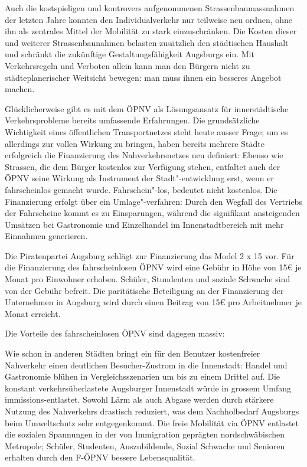   Auch die kostspieligen und kontrovers aufgenommenen Strassenbaumassnahmen 
  der letzten Jahre konnten den Individualverkehr nur teilweise neu ordnen, 
  ohne ihn als zentrales Mittel der Mobilität zu stark einzuschränken. Die 
  Kosten dieser und weiterer Strassenbaunahmen belasten zusätzlich den 
  städtischen Haushalt und schränkt die zukünftige Gestaltungsfähigkeit 
  Augsburgs ein. Mit Verkehrsregeln und Verboten allein kann man den Bürgern 
  nicht zu städteplanerischer Weitsicht bewegen: man muss ihnen ein besseres 
  Angebot machen.
  
  Glücklicherweise gibt es mit dem ÖPNV als Lösungsansatz für innerstädtische 
  Verkehrsprobleme bereits umfassende Erfahrungen. Die grundsätzliche 
  Wichtigkeit eines öffentlichen Transportnetzes steht heute ausser Frage; um 
  es allerdings zur vollen Wirkung zu bringen, haben bereits mehrere Städte 
  erfolgreich die Finanzierung des Nahverkehrsnetzes neu definiert: Ebenso wie 
  Strassen, die dem Bürger kostenlos zur Verfügung stehen, entfaltet auch der 
  ÖPNV seine Wirkung als Instrument der Stadt"-entwicklung erst, wenn er 
  fahrscheinlos gemacht wurde. Fahrschein"-los, bedeutet nicht kostenlos. Die 
  Finanzierung erfolgt über ein Umlage"-verfahren: Durch den Wegfall des 
  Vertriebs der Fahrscheine kommt es zu Einsparungen, während die signifikant 
  ansteigenden Umsätzen bei Gastronomie und Einzelhandel im Innenstadtbereich 
  mit mehr Einnahmen generieren.
  
  Die Piratenpartei Augsburg schlägt zur Finanzierung das Model 2 x 15 vor. 
  Für die Finanzierung des fahrscheinlosen ÖPNV wird eine Gebühr in Höhe von 
  15€ je Monat pro Einwohner erhoben. Schüler, Stundenten und soziale Schwache 
  sind von der Gebühr befreit. Die paritätische Beteiligung an der 
  Finanzierung der Unternehmen in Augsburg wird durch einen Beitrag von 15€ 
  pro Arbeitnehmer je Monat erreicht.
  
  Die Vorteile des fahrscheinlosen ÖPNV sind dagegen massiv:
  
  Wie schon in anderen Städten bringt ein für den Benutzer kostenfreier 
  Nahverkehr einen deutlichen Besucher-Zustrom in die Innenstadt: Handel und 
  Gastronomie blühen in Vergleichsszenarien um bis zu einem Drittel auf. Die 
  konstant verkehrsüberlastete Augsburger Innenstadt würde in grossem Umfang 
  immissions-entlastet. Sowohl Lärm als auch Abgase werden durch stärkere 
  Nutzung des Nahverkehrs drastisch reduziert, was dem Nachholbedarf Augsburgs 
  beim Umweltschutz sehr entgegenkommt. Die freie Mobilität via ÖPNV entlastet 
  die sozialen Spannungen in der von Immigration geprägten nordschwäbischen 
  Metropole; Schüler, Studenten, Auszubildende, Sozial Schwache und Senioren 
  erhalten durch den F-ÖPNV bessere Lebensqualität.
  
